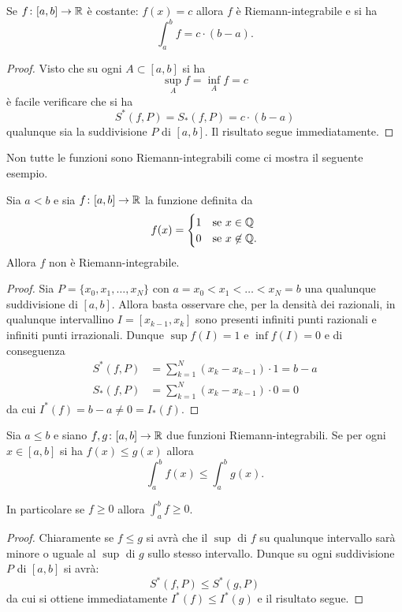 \begin{theorem}
\label{th:integrale_costante}
Se $f\colon[a,b]\to \mathbb R$ è costante: $f(x) = c$ allora
$f$ è Riemann-integrabile e si ha
\[
  \int_a^b f = c\cdot (b-a).
\]
\end{theorem}
%
\begin{proof}
Visto che su ogni $A\subset [a,b]$ si ha
\[
  \sup_A f = \inf_A f = c
\]
è facile verificare che si ha
\[
  S^*(f,P) = S_*(f,P) = c\cdot (b-a)
\]
qualunque sia la suddivisione $P$ di $[a,b]$. Il risultato segue immediatamente.
\end{proof}

Non tutte le funzioni sono Riemann-integrabili come ci mostra il seguente esempio.
\begin{example}
\mymark{**}
Sia $a<b$ e sia $f\colon[a,b]\to \mathbb R$ la funzione definita da
\[
 f(x) =
 \begin{cases}
   1 & \text{se $x\in \mathbb Q$}\\
   0 & \text{se $x\not \in \mathbb Q$}.
 \end{cases}
\]
Allora $f$ non è Riemann-integrabile.
\end{example}
%
\begin{proof}
\mymark{*}
Sia $P=\{x_0, x_1, \dots, x_N\}$ con $a=x_0 < x_1 < \dots < x_N = b$
una qualunque suddivisione di $[a,b]$.
Allora basta osservare che, per la densità dei razionali,
in qualunque intervallino $I=[x_{k-1}, x_k]$ sono presenti infiniti punti
razionali e infiniti punti irrazionali. Dunque $\sup f(I)=1$ e $\inf f(I)=0$ e di conseguenza
\begin{align*}
  S^*(f,P) &= \sum_{k=1}^N (x_k - x_{k-1})\cdot 1 = b-a \\
  S_*(f,P) &= \sum_{k=1}^N (x_k - x_{k-1})\cdot 0 = 0
\end{align*}
da cui $I^*(f) = b-a \neq 0 = I_*(f)$.
\end{proof}

\begin{theorem}
\mymark{*}
Sia $a\le b$ e siano
$f,g\colon [a,b]\to \mathbb R$ due funzioni Riemann-integrabili.
Se per ogni $x\in [a,b]$ si ha $f(x) \le g(x)$ allora
\[
  \int_a^b f(x) \le \int_a^b g(x).
\]

In particolare se $f\ge 0$ allora $\int_a^b f \ge 0$.
\end{theorem}
%
\begin{proof}
Chiaramente se $f \le g$ si avrà che il $\sup$ di $f$ su qualunque intervallo sarà minore o uguale al $\sup$ di $g$ sullo stesso intervallo. Dunque su ogni suddivisione $P$ di $[a,b]$ si avrà:
\[
  S^*(f,P) \le S^*(g,P)
\]
da cui si ottiene immediatamente $I^*(f) \le I^*(g)$ e il risultato segue.
\end{proof}

